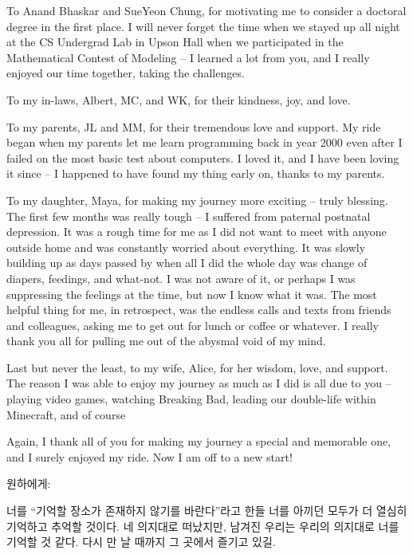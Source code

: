 To Anand Bhaskar and SueYeon Chung, for motivating me to consider a doctoral degree in the first place. I will never forget the time when we stayed up all night at the CS Undergrad Lab in Upson Hall when we participated in the Mathematical Contest of Modeling -- I learned a lot from you, and I really enjoyed our time together, taking the challenges.

To my in-laws, Albert, MC, and WK, for their kindness, joy, and love.

To my parents, JL and MM, for their tremendous love and support. My ride began when my parents let me learn programming back in year 2000 even after I failed on the most basic test about computers. I loved it, and I have been loving it since -- I happened to have found my thing early on, thanks to my parents. 

To my daughter, Maya, for making my journey more exciting -- truly blessing. The first few months was really tough -- I suffered from paternal postnatal depression. It was a rough time for me as I did not want to meet with anyone outside home and was constantly worried about everything. It was slowly building up as days passed by when all I did the whole day was change of diapers, feedings, and what-not. I was not aware of it, or perhaps I was suppressing the feelings at the time, but now I know what it was. The most helpful thing for me, in retrospect, was the endless calls and texts from friends and colleagues, asking me to get out for lunch or coffee or whatever. I really thank you all for pulling me out of the abysmal void of my mind.

Last but never the least, to my wife, Alice, for her wisdom, love, and support. The reason I was able to enjoy my journey as much as I did is all due to you -- playing video games, watching Breaking Bad, leading our double-life within Minecraft, and of course 

Again, I thank all of you for making my journey a special and memorable one, and I surely enjoyed my ride. Now I am off to a new start!


\vspace{4 em}

원하에게: 

너를 ``기억할 장소가 존재하지 않기를 바란다''라고 한들 너를 아끼던 모두가 더 열심히 기억하고 추억할 것이다. 네 의지대로 떠났지만, 남겨진 우리는 우리의 의지대로 너를 기억할 것 같다. 다시 만 날 때까지 그 곳에서 즐기고 있길.
